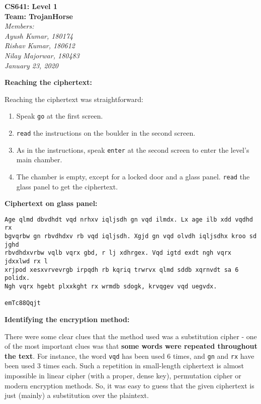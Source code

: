 \documentclass[11pt]{article}
\begin{document}
\begin{center}
  \Large\textbf{CS641: Level 1}\\
  \Large\textbf{Team: TrojanHorse}\\
  \medskip
  \large\textit{Members:\quad}\\
  \large\textit{Ayush Kumar, 180174\quad}\\
  \large\textit{Rishav Kumar, 180612\quad}\\
  \large\textit{Nilay Majorwar, 180483\quad}\\
  \medskip
  \large\textit{January 23, 2020\quad}
\end{center}

\bigskip
\bigskip

\textbf{Reaching the ciphertext: }
\medskip

Reaching the ciphertext was straightforward:
\begin{enumerate}
  \item Speak \texttt{go} at the first screen.
  \item \texttt{read} the instructions on the boulder in the second screen.
  \item As in the instructions, speak \texttt{enter} at the second screen to enter the level's main chamber.
  \item The chamber is empty, except for a locked door and a glass panel. \texttt{read} the glass panel to get the ciphertext.
\end{enumerate}

\bigskip
\bigskip

\textbf{Ciphertext on glass panel: }

\begin{lstlisting}
Age qlmd dbvdhdt vqd nrhxv iqljsdh gn vqd ilmdx. Lx age ilb xdd vqdhd rx 
bgvqrbw gn rbvdhdxv rb vqd iqljsdh. Xgjd gn vqd olvdh iqljsdhx kroo sd jghd 
rbvdhdxvrbw vqlb vqrx gbd, r lj xdhrgex. Vqd igtd exdt ngh vqrx jdxxlwd rx l 
xrjpod xesxvrvevrgb irpqdh rb kqriq trwrvx qlmd sddb xqrnvdt sa 6 polidx. 
Ngh vqrx hgebt plxxkght rx wrmdb sdogk, krvqgev vqd uegvdx.

emTc88Qqjt
\end{lstlisting}

\bigskip
\bigskip

\textbf{Identifying the encryption method: }
\medskip

There were some clear clues that the method used was a substitution cipher - one of the most important clues was that \textbf{some words were repeated throughout the text}. For instance, the word \texttt{vqd} has been used 6 times, and \texttt{gn} and \texttt{rx} have been used 3 times each. Such a repetition in small-length ciphertext is almost impossible in linear cipher (with a proper, dense key), permutation cipher or modern encryption methods. So, it was easy to guess that the given ciphertext is just (mainly) a substitution over the plaintext.
\medskip
\end{document}
